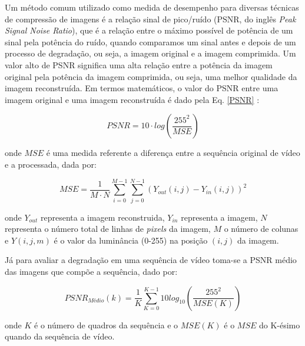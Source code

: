 Um método comum utilizado como medida de desempenho para diversas técnicas de compressão de imagens é a relação sinal de pico/ruído (PSNR, do inglês \textit{Peak Signal Noise Ratio}), que é a relação entre o máximo possível de potência de um sinal pela potência do ruído, quando comparamos um sinal antes e depois de um
processo de degradação, ou seja, a imagem original e a imagem comprimida. Um valor alto de PSNR significa uma alta relação entre a potência da imagem original pela potência da imagem comprimida, ou seja, uma melhor qualidade da imagem reconstruída. Em termos matemáticos, o valor do PSNR entre uma imagem original  e uma imagem reconstruída é dado pela Eq. \ref{PSNR} \cite{vergutz2013combinaccao} : 
\vspace{-3mm}
\begin{center}
	\begin{equation}
		\label{PSNR}
		PSNR = 10\cdot log\left(\displaystyle\frac{255^2}{MSE}\right)
	\end{equation}
\end{center}

\noindent onde $MSE$ é uma medida referente a diferença entre a sequência original de vídeo e a processada, dada por:
\vspace{-5mm}
\begin{center}
	\begin{equation}
		MSE = \displaystyle\frac{1}{M\cdot N}\sum_{i=0}^{M-1}\sum_{j=0}^{N-1} (Y_{out}(i,j) - Y_{in}(i,j))^2 
	\end{equation}
\end{center} 	
onde $Y_{out}$ representa a imagem reconstruida, $Y_{in}$ representa a imagem, $N$ representa o número total de linhas de \textit{pixels} da imagem, $M$ o número de colunas  e $Y(i,j,m)$ é o valor  da luminância (0-255) na posição $(i,j)$ da imagem.

Já para avaliar a degradação em uma sequência de vídeo toma-se a PSNR médio das imagens que compõe a sequência, dado por:
\vspace{-5mm}
\begin{center}
	\begin{equation}
		PSNR_{Médio}(k) = \displaystyle\frac{1}{K}\sum_{K=0}^{K-1} 10log_{10}\left(\frac{255^2}{MSE(K)}\right)
	\end{equation}
\end{center}

\noindent onde $K$ é o número de quadros da sequência e o $MSE(K)$ é o $MSE$ do K-ésimo quando da sequência de vídeo.
